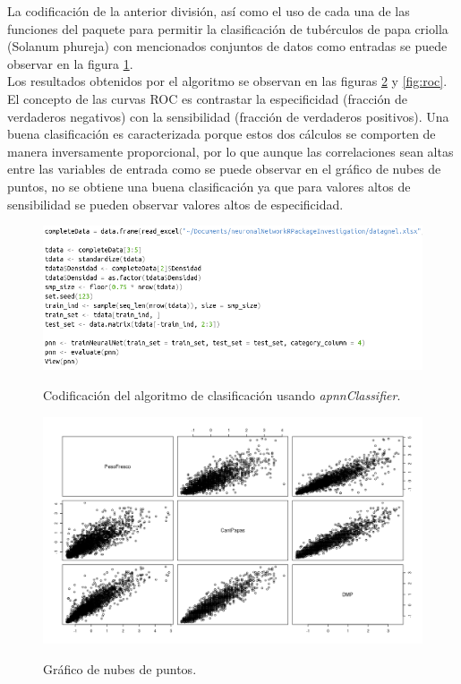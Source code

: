 La codificación de la anterior división, así como el uso de cada una de las funciones del paquete para permitir la clasificación de tubérculos de papa criolla (Solanum phureja) con mencionados conjuntos de datos como entradas se puede observar en la figura \ref{fig:packageuse}.\\

Los resultados obtenidos por el algoritmo se observan en las figuras \ref{fig:cloudpoints} y  \ref{fig:roc}. El concepto de las curvas ROC es contrastar la especificidad (fracción de verdaderos negativos) con la sensibilidad (fracción de verdaderos positivos). Una buena clasificación es caracterizada porque estos dos cálculos se comporten de manera inversamente proporcional, por lo que aunque las correlaciones sean altas entre las variables de entrada como se puede observar en el gráfico de nubes de puntos, no se obtiene una buena clasificación ya que para valores altos de sensibilidad se pueden observar valores altos de especificidad.\\

\begin{figure}[h!]
	\caption{Codificación del algoritmo de clasificación usando \textit{apnnClassifier}.}
	\centering
	\includegraphics[scale=0.6]{packageuse.png}
	\label{fig:packageuse}
\end{figure}

\begin{figure}[h!]
	\caption{Gráfico de nubes de puntos.}
	\centering
	\includegraphics[scale=0.6]{cloudpoints.png}
	\label{fig:cloudpoints}
\end{figure}

